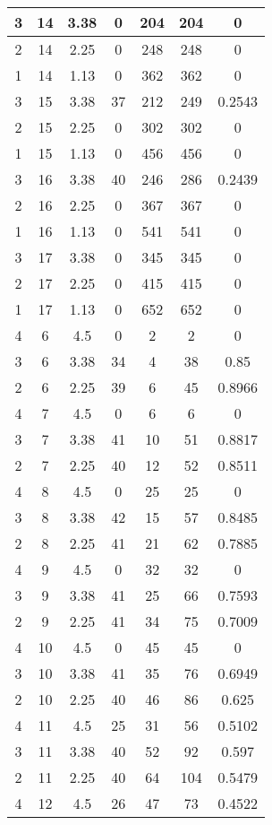 \documentclass[letterpaper, 12pt]{article}
\begin{document}
\begin{longtable}{|c|c|c|c|c|c|c|}
\hline
3 & 14 & 3.38 & 0 & 204 & 204 & 0 \\
\hline
2 & 14 & 2.25 & 0 & 248 & 248 & 0 \\
\hline
1 & 14 & 1.13 & 0 & 362 & 362 & 0 \\
\hline
3 & 15 & 3.38 & 37 & 212 & 249 & 0.2543 \\
\hline
2 & 15 & 2.25 & 0 & 302 & 302 & 0 \\
\hline
1 & 15 & 1.13 & 0 & 456 & 456 & 0 \\
\hline
3 & 16 & 3.38 & 40 & 246 & 286 & 0.2439 \\
\hline
2 & 16 & 2.25 & 0 & 367 & 367 & 0 \\
\hline
1 & 16 & 1.13 & 0 & 541 & 541 & 0 \\
\hline
3 & 17 & 3.38 & 0 & 345 & 345 & 0 \\
\hline
2 & 17 & 2.25 & 0 & 415 & 415 & 0 \\
\hline
1 & 17 & 1.13 & 0 & 652 & 652 & 0 \\
\hline
4 & 6 & 4.5 & 0 & 2 & 2 & 0 \\
\hline
3 & 6 & 3.38 & 34 & 4 & 38 & 0.85 \\
\hline
2 & 6 & 2.25 & 39 & 6 & 45 & 0.8966 \\
\hline
4 & 7 & 4.5 & 0 & 6 & 6 & 0 \\
\hline
3 & 7 & 3.38 & 41 & 10 & 51 & 0.8817 \\
\hline
2 & 7 & 2.25 & 40 & 12 & 52 & 0.8511 \\
\hline
4 & 8 & 4.5 & 0 & 25 & 25 & 0 \\
\hline
3 & 8 & 3.38 & 42 & 15 & 57 & 0.8485 \\
\hline
2 & 8 & 2.25 & 41 & 21 & 62 & 0.7885 \\
\hline
4 & 9 & 4.5 & 0 & 32 & 32 & 0 \\
\hline
3 & 9 & 3.38 & 41 & 25 & 66 & 0.7593 \\
\hline
2 & 9 & 2.25 & 41 & 34 & 75 & 0.7009 \\
\hline
4 & 10 & 4.5 & 0 & 45 & 45 & 0 \\
\hline
3 & 10 & 3.38 & 41 & 35 & 76 & 0.6949 \\
\hline
2 & 10 & 2.25 & 40 & 46 & 86 & 0.625 \\
\hline
4 & 11 & 4.5 & 25 & 31 & 56 & 0.5102 \\
\hline
3 & 11 & 3.38 & 40 & 52 & 92 & 0.597 \\
\hline
2 & 11 & 2.25 & 40 & 64 & 104 & 0.5479 \\
\hline
4 & 12 & 4.5 & 26 & 47 & 73 & 0.4522 \\

\end{longtable}
\end{document}
